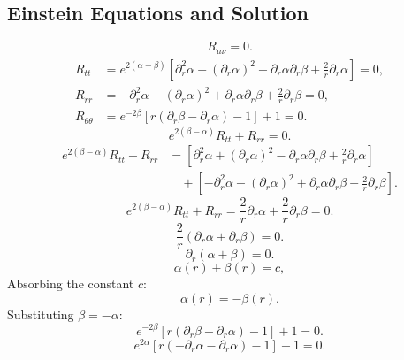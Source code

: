 \documentclass[11pt, a4paper]{report}
\begin{document}
\subsection{Einstein Equations and Solution}
\begin{equation}
R_{\mu\nu} = 0.
\end{equation}
\begin{align}
R_{tt} &= e^{2(\alpha-\beta)} \left[ \partial_r^2\alpha + (\partial_r\alpha)^2 - \partial_r\alpha\partial_r\beta + \frac{2}{r}\partial_r\alpha \right] = 0, \\
R_{rr} &= -\partial_r^2\alpha - (\partial_r\alpha)^2 + \partial_r\alpha\partial_r\beta + \frac{2}{r}\partial_r\beta = 0, \\
R_{\theta\theta} &= e^{-2\beta} \left[ r(\partial_r\beta - \partial_r\alpha) - 1 \right] + 1 = 0.
\end{align}
\begin{equation}
e^{2(\beta-\alpha)} R_{tt} + R_{rr} = 0.
\end{equation}
\begin{align}
e^{2(\beta-\alpha)} R_{tt} + R_{rr} &= \left[ \partial_r^2\alpha + (\partial_r\alpha)^2 - \partial_r\alpha\partial_r\beta + \frac{2}{r}\partial_r\alpha \right] \nonumber \\
&\quad + \left[ -\partial_r^2\alpha - (\partial_r\alpha)^2 + \partial_r\alpha\partial_r\beta + \frac{2}{r}\partial_r\beta \right].
\end{align}
\begin{equation}
e^{2(\beta-\alpha)} R_{tt} + R_{rr} = \frac{2}{r}\partial_r\alpha + \frac{2}{r}\partial_r\beta = 0.
\end{equation}
\begin{equation}
\frac{2}{r} \left( \partial_r\alpha + \partial_r\beta \right) = 0.
\end{equation}
\begin{equation}
\partial_r \left( \alpha + \beta \right) = 0.
\end{equation}
\begin{equation}
\alpha(r) + \beta(r) = c,
\end{equation}
Absorbing the constant $c$:
\begin{equation}
\alpha(r) = -\beta(r).
\end{equation}
Substituting $\beta = -\alpha$:
\begin{equation}
e^{-2\beta} \left[ r(\partial_r\beta - \partial_r\alpha) - 1 \right] + 1 = 0.
\end{equation}
\begin{equation}
e^{2\alpha} \left[ r(-\partial_r\alpha - \partial_r\alpha) - 1 \right] + 1 = 0.
\end{equation}
\end{document}
